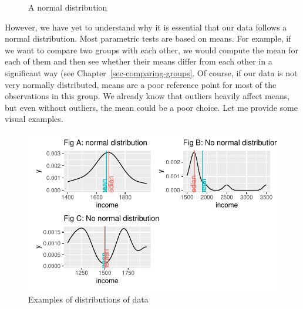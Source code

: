 \documentclass[
  letterpaper,
]{krantz}
\begin{document}
\begin{figure}


\caption{\label{fig-normal-distribution2}A normal distribution}

\end{figure}%

However, we have yet to understand why it is essential that our data
follows a normal distribution. Most parametric tests are based on means.
For example, if we want to compare two groups with each other, we would
compute the mean for each of them and then see whether their means
differ from each other in a significant way (see
Chapter~\ref{sec-comparing-groups}. Of course, if our data is not very
normally distributed, means are a poor reference point for most of the
observations in this group. We already know that outliers heavily affect
means, but even without outliers, the mean could be a poor choice. Let
me provide some visual examples.

\begin{figure}[H]

{\centering \includegraphics{09_sources_of_bias_files/figure-latex/comparing-distributions-plus-means-1.pdf}

}

\caption{Examples of distributions of data}

\end{figure}%
\end{document}

